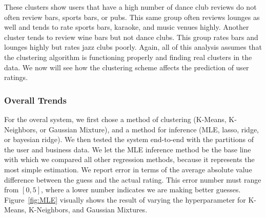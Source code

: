 \documentclass[11pt]{article}
\begin{document}
These clusters show users that have a high number of dance club reviews do not often review bars, sports bars, or pubs. This same group often reviews lounges as well and tends to rate sports bars, karaoke, and music venues highly. Another cluster tends to review wine bars but not dance clubs. This group rates bars and lounges highly but rates jazz clubs poorly. Again, all of this analysis assumes that the clustering algorithm is functioning properly and finding real clusters in the data. We now will see how the clustering scheme affects the prediction of user ratings.

\subsubsection{Overall Trends}
For the overal system, we first chose a method of clustering (K-Means, K-Neighbors, or Gaussian Mixture), and a method for inference (MLE, lasso, ridge, or bayesian ridge). We then tested the system end-to-end with the partitions of the user and business data. We let the MLE inference method be the base line with which we compared all other regression methods, because it represents the most simple estimation. We report error in terms of the average absolute value difference between the guess and the actual rating. This error number must range from $[0, 5]$, where a lower number indicates we are making better guesses. Figure~\ref{fig:MLE} visually shows the result of varying the hyperparameter for K-Means, K-Neighbors, and Gaussian Mixtures.
\end{document}

